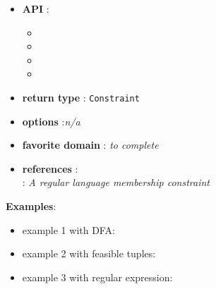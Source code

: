\begin{itemize}
	\item \textbf{API} :
	\begin{itemize}
		\item {}
		\item {}
		\item {}
		\item {}
	\end{itemize}
	\item \textbf{return type} : \texttt{Constraint}
	\item \textbf{options} :\emph{n/a}
	\item \textbf{favorite domain} : \emph{to complete}
	\item \textbf{references} :\\
       \cite{PesantCP04}: \emph{A regular language membership constraint}
\end{itemize}

\textbf{Examples}:
\begin{itemize}
	\item example 1 with DFA:
\end{itemize}



\begin{itemize}
	\item example 2 with feasible tuples:
\end{itemize}


\begin{itemize}
	\item example 3 with regular expression:
\end{itemize}

